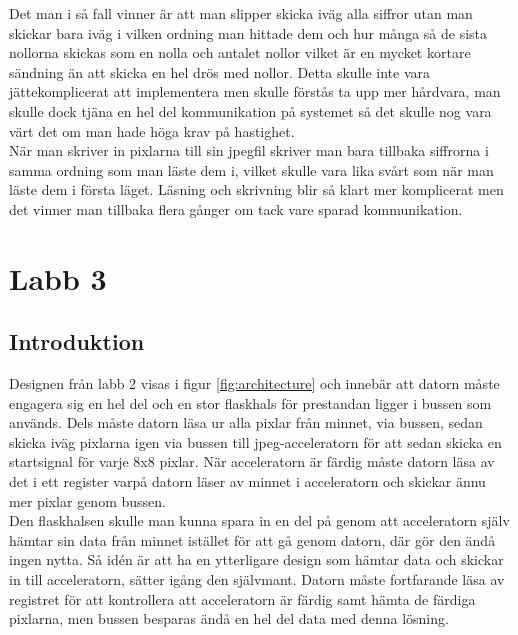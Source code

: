 \documentclass[a4paper]{article}
\begin{document}
Det man i så fall vinner är att man slipper skicka iväg alla siffror
utan man skickar bara iväg i vilken ordning man hittade dem och hur
många så de sista nollorna skickas som en nolla och antalet nollor
vilket är en mycket kortare sändning än att skicka en hel drös med
nollor. Detta skulle inte vara jättekomplicerat att implementera men
skulle förstås ta upp mer hårdvara, man skulle dock tjäna en hel del
kommunikation på systemet så det skulle nog vara värt det om man hade
höga krav på hastighet.\\

När man skriver in pixlarna till sin jpegfil skriver man bara tillbaka
siffrorna i samma ordning som man läste dem i, vilket skulle vara lika
svårt som när man läste dem i första läget. Läsning och skrivning blir
så klart mer komplicerat men det vinner man tillbaka flera gånger om
tack vare sparad kommunikation.\\

\section{Labb 3}
\subsection{Introduktion}

Designen från labb 2 visas i figur \ref{fig:architecture} och innebär
att datorn måste engagera sig en hel del och en stor flaskhals för
prestandan ligger i bussen som används. Dels måste datorn läsa ur alla
pixlar från minnet, via bussen, sedan skicka iväg pixlarna igen via
bussen till jpeg-acceleratorn för att sedan skicka en startsignal för
varje 8x8 pixlar. När acceleratorn är färdig måste datorn läsa av det i
ett register varpå datorn läser av minnet i acceleratorn och skickar
ännu mer pixlar genom bussen.\\

Den flaskhalsen skulle man kunna spara in en del på genom att
acceleratorn själv hämtar sin data från minnet istället för att gå genom
datorn, där gör den ändå ingen nytta. Så idén är att ha en ytterligare
design som hämtar data och skickar in till acceleratorn, sätter igång
den självmant. Datorn måste fortfarande läsa av registret för att
kontrollera att acceleratorn är färdig samt hämta de färdiga pixlarna,
men bussen besparas ändå en hel del data med denna lösning.\\
\end{document}
